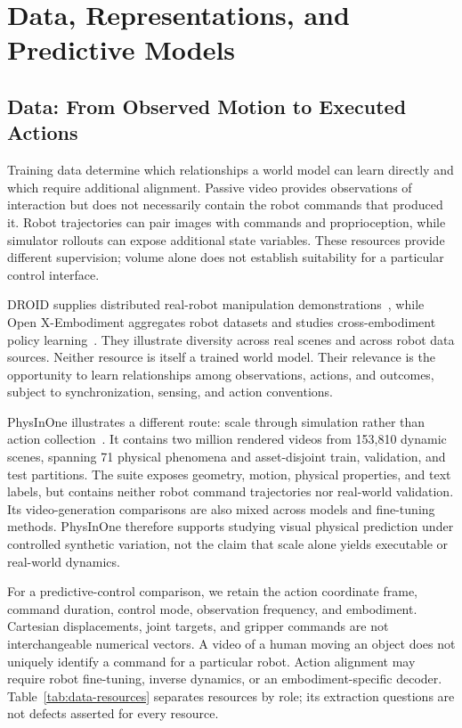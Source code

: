 \section{Data, Representations, and Predictive Models}
\label{sec:data}

\subsection{Data: From Observed Motion to Executed Actions}
Training data determine which relationships a world model can learn directly and which require additional alignment. Passive video provides observations of interaction but does not necessarily contain the robot commands that produced it. Robot trajectories can pair images with commands and proprioception, while simulator rollouts can expose additional state variables. These resources provide different supervision; volume alone does not establish suitability for a particular control interface.

DROID supplies distributed real-robot manipulation demonstrations~\cite{khazatsky2024droid}, while Open X-Embodiment aggregates robot datasets and studies cross-embodiment policy learning~\cite{oxe2024}. They illustrate diversity across real scenes and across robot data sources. Neither resource is itself a trained world model. Their relevance is the opportunity to learn relationships among observations, actions, and outcomes, subject to synchronization, sensing, and action conventions.

PhysInOne illustrates a different route: scale through simulation rather than action collection~\cite{zhou2026physinone}. It contains two million rendered videos from 153,810 dynamic scenes, spanning 71 physical phenomena and asset-disjoint train, validation, and test partitions. The suite exposes geometry, motion, physical properties, and text labels, but contains neither robot command trajectories nor real-world validation. Its video-generation comparisons are also mixed across models and fine-tuning methods. PhysInOne therefore supports studying visual physical prediction under controlled synthetic variation, not the claim that scale alone yields executable or real-world dynamics.

For a predictive-control comparison, we retain the action coordinate frame, command duration, control mode, observation frequency, and embodiment. Cartesian displacements, joint targets, and gripper commands are not interchangeable numerical vectors. A video of a human moving an object does not uniquely identify a command for a particular robot. Action alignment may require robot fine-tuning, inverse dynamics, or an embodiment-specific decoder. Table~\ref{tab:data-resources} separates resources by role; its extraction questions are not defects asserted for every resource.

